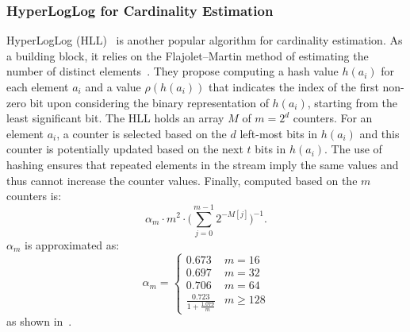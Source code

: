 \subsubsection{HyperLogLog for Cardinality Estimation}
\label{sktc-ssec:HyperLogLog}





HyperLogLog (HLL)~\cite{Flajolet07hyperloglog,heule2013hyperloglog} is another popular algorithm for cardinality estimation.
As a building block, it relies on the Flajolet–Martin method of estimating the number of distinct elements~\cite{flajolet1983probabilistic, LogLog}. They propose computing a hash value $h(a_i)$ for each element $a_i$ and a value $\rho(h(a_i))$ that indicates the index of the first non-zero bit upon considering the binary representation of $h(a_i)$, starting from the least significant bit. 
The HLL holds an array $M$ of $m=2^d$ counters. For an element $a_i$, a counter is selected based on the $d$ left-most bits in $h(a_i)$ and this counter is potentially updated based on the next $t$ bits in  $h(a_i)$. 
The use of hashing ensures that repeated elements in the stream imply the same values and thus cannot increase the counter values. Finally,  computed based on the $m$ counters is:
\[\alpha_m  \cdot m^2 \cdot \big(\sum_{j = 0}^{m-1} {2^{-M[j]}}\big)^{-1}.\]
$\alpha_m$ is approximated as:
\[\alpha_m=\begin{cases}
0.673 & m=16 \\
0.697 & m=32 \\
0.706 & m=64 \\
\frac{0.723}{1+\frac{1.079}{m}} & m \geq 128
\end{cases}\]
as shown in~\cite{Flajolet07hyperloglog}.


